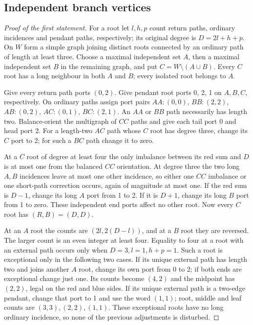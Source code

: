 \subsection{Independent branch vertices}
\begin{proof}[Proof of the first statement]
For a root let $l,h,p$ count return paths, ordinary incidences and
pendant paths, respectively; its original degree is $D=2l+h+p$.
On $W$ form a simple graph joining distinct roots connected by an
ordinary path of length at least three. Choose a maximal independent
set $A$, then a maximal independent set $B$ in the remaining graph,
and put $C=W\setminus(A\cup B)$. Every $C$ root has a long neighbour
in both $A$ and $B$; every isolated root belongs to $A$.

Give every return path ports $(0,2)$. Give pendant root ports
0, 2, 1 on $A,B,C$, respectively. On ordinary paths assign port pairs
$AA:(0,0)$, $BB:(2,2)$, $AB:(0,2)$, $AC:(0,1)$, $BC:(2,1)$.
An $AA$ or $BB$ path necessarily has length two. Balance-orient the
multigraph of $CC$ paths and give each tail port 0 and head port 2.
For a length-two $AC$ path whose $C$ root has degree three, change
its $C$ port to 2; for such a $BC$ path change it to zero.

At a $C$ root of degree at least four the only imbalance between
its red sum and $D$ is at most one from the balanced $CC$ orientation.
At degree three the two long $A,B$ incidences leave at most one other
incidence, so either one $CC$ imbalance or one short-path correction
occurs, again of magnitude at most one. If the red sum is $D-1$,
change its long $A$ port from 1 to 2. If it is $D+1$, change its
long $B$ port from 1 to zero. These independent end ports affect no
other root. Now every $C$ root has $(R,B)=(D,D)$.

At an $A$ root the counts are $(2l,2(D-l))$, and at a $B$ root they
are reversed. The larger count is an even integer at least four.
Equality to four at a root with an external path occurs only when
$D=3,l=1,h+p=1$. Such a root is exceptional only in the following
two cases. If its unique external path has length two and joins
another $A$ root, change its own port from 0 to 2; if both ends
are exceptional change just one. Its counts become $(4,2)$ and the
midpoint has $(2,2)$, legal on the red and blue sides. If its unique
external path is a two-edge pendant, change that port to 1 and use
the word $(1,1)$; root, middle and leaf counts are $(3,3),(2,2),(1,1)$.
These exceptional roots have no long ordinary incidence, so none of
the previous adjustments is disturbed.


\end{proof}

